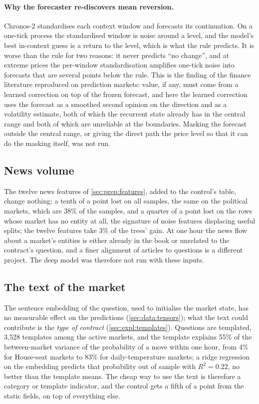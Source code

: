 \paragraph{Why the forecaster re-discovers mean reversion.}
\label{sec:analysis:tsfm}
Chronos-2 standardises each context window and forecasts its continuation.  On a one-tick
process the standardised window is noise around a level, and the model's best in-context
guess is a return to the level, which is what the rule predicts.  It is worse than the rule
for two reasons: it never predicts ``no change'', and at extreme prices the per-window
standardisation amplifies one-tick noise into forecasts that are several points below the
rule.  This is the finding of the finance literature
\cite{rahimikia2025revisiting,dewage2026hybrid} reproduced on prediction markets: value,
if any, must come from a learned correction on top of the frozen forecast, and here the
learned correction uses the forecast as a smoothed second opinion on the direction and as a
volatility estimate, both of which the recurrent state already has in the central range and
both of which are unreliable at the boundaries.  Masking the forecast outside the central
range, or giving the direct path the price level so that it can do the masking itself, was
not run.

\subsection{News volume}
\label{sec:external:news}

The twelve news features of \cref{sec:prep:features}, added to the control's table, change
nothing: a tenth of a point lost on all samples, the same on the political markets, which are
38\% of the samples, and a quarter of a point lost on the rows whose market has no entity at
all, the signature of noise features displacing useful splits; the twelve features take 3\%
of the trees' gain.  At one hour the news flow about a market's entities is either already
in the book or unrelated to the contract's question, and a finer alignment of articles to
questions is a different project.  The deep model was therefore not run with these inputs.

\subsection{The text of the market}
\label{sec:external:text}

The sentence embedding of the question, used to initialise the market state, has no
measurable effect on the predictions (\cref{sec:data:tensors}); what the text could
contribute is the \emph{type of contract} (\cref{sec:expl:templates}).  Questions are
templated, 3{,}528 templates among the active markets, and the template explains 55\% of
the between-market variance of the probability of a move within one hour, from 4\% for
House-seat markets to 83\% for daily-temperature markets; a ridge regression on the
embedding predicts that probability out of sample with $R^2 = 0.22$, no better than the
template means.  The cheap way to use the text is therefore a category or template
indicator, and the control gets a fifth of a point from the static fields, on top of
everything else.

